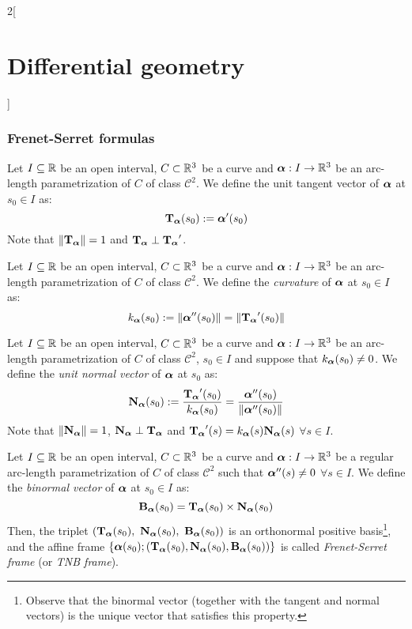 \documentclass[../../../main.tex]{subfiles}
\begin{document}
\begin{multicols}{2}[\section{Differential geometry}]
  \subsubsection{Frenet-Serret formulas}
  \begin{definition}
    Let $I\subseteq\RR$ be an open interval, $C\subset\RR^3$ be a curve and $\vf{\alpha}:I\rightarrow\RR^3$ be an arc-length parametrization of $C$ of class $\mathcal{C}^2$. We define the unit tangent vector of $\vf{\alpha}$ at $s_0\in I$ as: $$\T\alpha(s_0):=\vf{\alpha}'(s_0)$$ Note that $\|\T\alpha\|=1$ and $\T\alpha\perp\T\alpha'$.
  \end{definition}
  \begin{definition}
    Let $I\subseteq\RR$ be an open interval, $C\subset\RR^3$ be a curve and $\vf{\alpha}:I\rightarrow\RR^3$ be an arc-length parametrization of $C$ of class $\mathcal{C}^2$. We define the \emph{curvature} of $\vf{\alpha}$ at $s_0\in I$ as: $$k_{\vf\alpha}(s_0):=\|\vf{\alpha}''(s_0)\|=\|\T\alpha'(s_0)\|$$
  \end{definition}
  \begin{definition}
    Let $I\subseteq\RR$ be an open interval, $C\subset\RR^3$ be a curve and $\vf{\alpha}:I\rightarrow\RR^3$ be an arc-length parametrization of $C$ of class $\mathcal{C}^2$, $s_0\in I$ and suppose that $k_{\vf\alpha}(s_0)\ne 0$. We define the \emph{unit normal vector} of $\vf{\alpha}$ at $s_0$ as: $$\N\alpha(s_0):=\frac{\T\alpha'(s_0)}{k_{\vf\alpha}(s_0)}=\frac{\vf{\alpha}''(s_0)}{\|\vf{\alpha}''(s_0)\|}$$
    Note that $\|\N\alpha\|=1$, $\N\alpha\perp\T\alpha$ and $\T\alpha'(s)=k_{\vf\alpha}(s)\N\alpha(s)$ $\forall s\in I$.
  \end{definition}
  \begin{definition}
    Let $I\subseteq\RR$ be an open interval, $C\subset\RR^3$ be a curve and $\vf{\alpha}:I\rightarrow\RR^3$ be a regular arc-length parametrization of $C$ of class $\mathcal{C}^2$ such that $\vf{\alpha}''(s)\ne 0$ $\forall s\in I$. We define the \emph{binormal vector} of $\vf{\alpha}$ at $s_0\in I$ as:
    $$\B\alpha(s_0)=\T\alpha(s_0)\times\N\alpha(s_0)$$
    Then, the triplet $(\T\alpha(s_0),\ \N\alpha(s_0),\ \B\alpha(s_0))$ is an orthonormal positive basis\footnote{Observe that the binormal vector (together with the tangent and normal vectors) is the unique vector that satisfies this property.}, and the affine frame $\{\vf{\alpha}(s_0); (\T\alpha(s_0),\N\alpha(s_0),\B\alpha(s_0))\}$ is called \emph{Frenet-Serret frame} (or \emph{TNB frame}).
  \end{definition}

\end{multicols}
\end{document}
